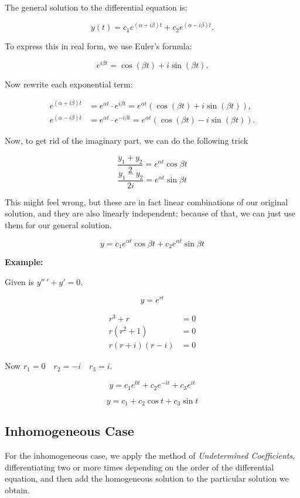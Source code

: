 The general solution to the differential equation is:

\[
    y(t) = c_1 e^{(\alpha + i\beta)t} + c_2 e^{(\alpha - i\beta)t}.
\]

To express this in real form, we use Euler’s formula:

\[
    e^{i\beta t} = \cos(\beta t) + i\sin(\beta t).
\]

Now rewrite each exponential term:

\begin{align*}
    e^{(\alpha + i\beta)t} & = e^{\alpha t} \cdot e^{i\beta t} = e^{\alpha t} (\cos(\beta t) + i \sin(\beta t)),  \\
    e^{(\alpha - i\beta)t} & = e^{\alpha t} \cdot e^{-i\beta t} = e^{\alpha t} (\cos(\beta t) - i \sin(\beta t)).
\end{align*}

Now, to get rid of the imaginary part, we can do the following trick

\[
    \frac{y_1 + y_2}{2} = e^{\alpha t}\cos\beta t
\]
\[
    \frac{y_1 - y_2}{2i} = e^{\alpha t}\sin\beta t
\]

This might feel wrong, but these are in fact linear combinations of our original solution,
and they are also linearly independent; because of that, we can just use them for our general solution.

\[y = c_1 e^{\alpha t}\cos\beta t + c_2  e^{\alpha t}\sin\beta t\]

\textbf{Example:}

Given is \(y''\,' + y' = 0\).

\[
    y = e^{rt}
\]

\begin{align*}
    r^3 + r         & = 0 \\
    r(r^2 + 1)      & = 0 \\
    r(r + i)(r - i) & = 0
\end{align*}

Now \(r_1 = 0 \quad r_2 = -i \quad r_3 = i\).

\[
    y = c_1 e^{0t} + c_2 e^{-it} + c_3 e^{it}
\]

\[
    y = c_1 + c_2 \cos t + c_3 \sin t
\]

\subsection{Inhomogeneous Case}

For the inhomogeneous case, we apply the method of \emph{Undetermined Coefficients},
differentiating two or more times depending on the order of the differential equation, and then add the
homogeneous solution to the particular solution we obtain.

